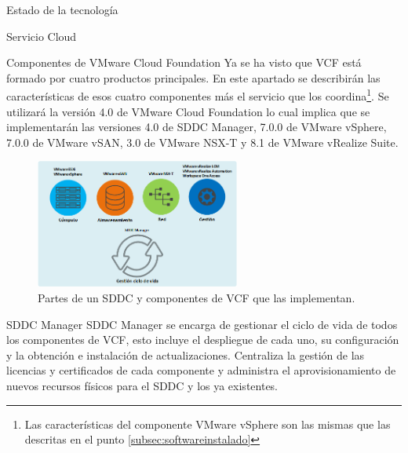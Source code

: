 \begin{chapter}{Estado de la tecnología}
\begin{section}{Servicio Cloud}
\begin{subsection}{Componentes de VMware Cloud Foundation}
    Ya se ha visto que VCF está formado por cuatro productos principales. En este apartado se describirán las características de esos cuatro componentes más el servicio que los coordina\footnote{Las características del componente VMware vSphere son las mismas que las descritas en el punto \ref*{subsec:softwareinstalado}}. Se utilizará la versión 4.0 de VMware Cloud Foundation lo cual implica que se implementarán las versiones\cite{componentesCloudFound} 4.0 de SDDC Manager, 7.0.0 de VMware vSphere, 7.0.0 de VMware vSAN, 3.0 de VMware NSX-T y 8.1 de VMware vRealize Suite.
    \begin{figure}[h]
        \centering
            \includegraphics[width=0.6\textwidth]{imaxes/VCF-componentes/ComponentesVCF.png}
            \caption{Partes de un SDDC y componentes de VCF que las implementan.}
            \label{fig:componentes-funciones-VCF}
        \end{figure}
        \FloatBarrier
    \begin{subsubsection}{SDDC Manager}
        SDDC Manager se encarga de gestionar el ciclo de vida de todos los componentes de VCF, esto incluye el despliegue de cada uno, su configuración y la obtención e instalación de actualizaciones. Centraliza la gestión de las licencias y certificados de cada componente y administra el aprovisionamiento de nuevos recursos físicos para el SDDC y los ya existentes.
    \end{subsubsection}
    

\end{subsection}
\end{section}
\end{chapter}
